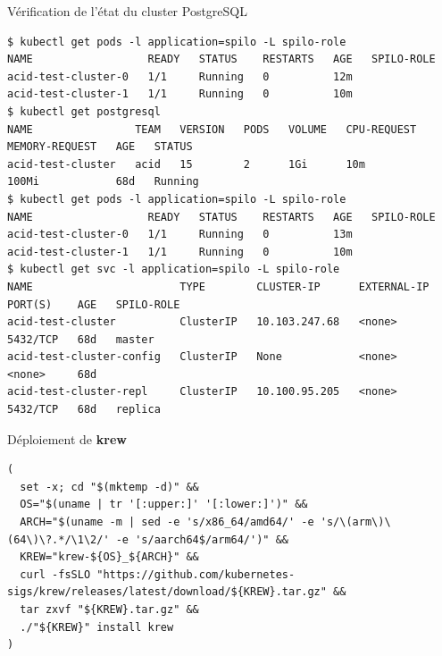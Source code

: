 
\begin{frame}[fragile]{Vérification de l'état du cluster PostgreSQL}

\begin{tiny}
\begin{Verbatim}[commandchars=\&\{\}]
$ kubectl get pods -l application=spilo -L spilo-role
NAME                  READY   STATUS    RESTARTS   AGE   SPILO-ROLE
acid-test-cluster-0   1/1     Running   0          12m   
acid-test-cluster-1   1/1     Running   0          10m   
$ kubectl get postgresql
NAME                TEAM   VERSION   PODS   VOLUME   CPU-REQUEST   MEMORY-REQUEST   AGE   STATUS
acid-test-cluster   acid   15        2      1Gi      10m           100Mi            68d   Running
$ kubectl get pods -l application=spilo -L spilo-role
NAME                  READY   STATUS    RESTARTS   AGE   SPILO-ROLE
acid-test-cluster-0   1/1     Running   0          13m   
acid-test-cluster-1   1/1     Running   0          10m   
$ kubectl get svc -l application=spilo -L spilo-role
NAME                       TYPE        CLUSTER-IP      EXTERNAL-IP   PORT(S)    AGE   SPILO-ROLE
acid-test-cluster          ClusterIP   10.103.247.68   <none>        5432/TCP   68d   master
acid-test-cluster-config   ClusterIP   None            <none>        <none>     68d   
acid-test-cluster-repl     ClusterIP   10.100.95.205   <none>        5432/TCP   68d   replica
\end{Verbatim}
\end{tiny}

\end{frame}


\begin{frame}[fragile]{Déploiement de \textbf{krew}}

\begin{tiny}
\begin{Verbatim}[commandchars=\&\#\#]
(
  set -x; cd "$(mktemp -d)" &&
  OS="$(uname | tr '[:upper:]' '[:lower:]')" &&
  ARCH="$(uname -m | sed -e 's/x86_64/amd64/' -e 's/\(arm\)\(64\)\?.*/\1\2/' -e 's/aarch64$/arm64/')" &&
  KREW="krew-${OS}_${ARCH}" &&
  curl -fsSLO "https://github.com/kubernetes-sigs/krew/releases/latest/download/${KREW}.tar.gz" &&
  tar zxvf "${KREW}.tar.gz" &&
  ./"${KREW}" install krew
)
\end{Verbatim}
\end{tiny}

\end{frame}

